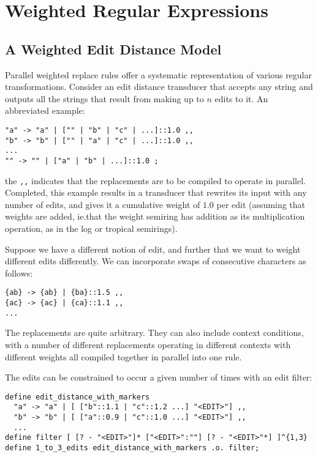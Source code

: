 \documentclass{llncs}
\begin{document}
\section{Weighted Regular Expressions}

\subsection{A Weighted Edit Distance Model}

Parallel weighted replace rules offer a systematic representation of various
regular transformations. Consider an edit distance transducer that accepts
any string and outputs all the strings that result from making up to $n$ edits
to it. An abbreviated example:

\begin{framed}
\begin{verbatim}
"a" -> "a" | ["" | "b" | "c" | ...]::1.0 ,,
"b" -> "b" | ["" | "a" | "c" | ...]::1.0 ,,
...
"" -> "" | ["a" | "b" | ...]::1.0 ;
\end{verbatim}
\end{framed}

the \verb+,,+ indicates that the replacements are to be compiled to operate
in parallel. Completed, this example results in a transducer that rewrites
its input with any number of edits, and gives it a cumulative weight of
$1.0$ per edit (assuming that weights are added, ie.\@ that the weight semiring
has addition as its multiplication operation, as in the log or tropical
semirings).

Suppose we have a different notion of edit, and further that we want to weight
different edits differently. We can incorporate swaps of consecutive
characters as follows:

\begin{framed}
\begin{verbatim}
{ab} -> {ab} | {ba}::1.5 ,,
{ac} -> {ac} | {ca}::1.1 ,,
... 
\end{verbatim}
\end{framed}

The replacements are quite arbitrary. They can also include context conditions,
with a number of different replacements operating in different contexts with
different weights all compiled together in parallel into one rule.

The edits can be constrained to occur a given number of times with an edit
filter:

\begin{framed}
\begin{verbatim}
define edit_distance_with_markers
  "a" -> "a" | [ ["b"::1.1 | "c"::1.2 ...] "<EDIT>"] ,,
  "b" -> "b" | [ ["a"::0.9 | "c"::1.0 ...] "<EDIT>"] ,,
  ...
define filter [ [? - "<EDIT>"]* ["<EDIT>":""] [? - "<EDIT>"*] ]^{1,3}
define 1_to_3_edits edit_distance_with_markers .o. filter;
\end{verbatim}
\end{framed}
\end{document}
